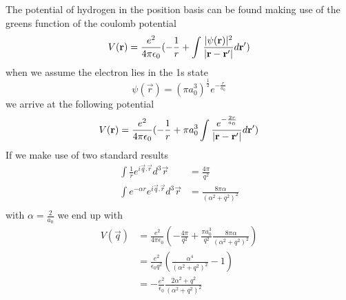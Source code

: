 The potential of hydrogen
in the position basis can be found
making use of the greens
function of the coulomb potential\cite{AQP_Problems}
\begin{equation}
    V(\mathbf{r}) = \frac{e^2}{4 \pi \epsilon_0}(
    -\frac{1}{r}
    + \int{\frac{\lvert\psi(\mathbf{r})\rvert^2}{
            \lvert\mathbf{r} - \mathbf{r'}\rvert} d\mathbf{r}'})
\end{equation}
when we assume the electron
lies in the 1s state\cite{griffiths_schroeter_2018}
\begin{equation}
    \psi(\vec{r}) = {(\pi a_0^3)}^{\frac{1}{2}} e^{-\frac{r}{a_0}}
\end{equation}
we arrive at the following potential
\begin{equation}
    V(\mathbf{r}) = \frac{e^2}{4 \pi \epsilon_0}(
    -\frac{1}{r}
    + \pi a_0^3\int{\frac{e^{-\frac{2r}{a_0}}}{
            \lvert\mathbf{r} - \mathbf{r'}\rvert} d\mathbf{r}'})
\end{equation}
If we make use of two standard results
\begin{align}
    \int{\frac{1}{r} e^{i\vec{q}.\vec{r}} d^3\vec{r}}
     & = \frac{4 \pi}{q^2}                         \\
    \int{e^{-\alpha r} e^{i\vec{q}.\vec{r}} d^3\vec{r}}
     & = \frac{8 \pi \alpha}{{(\alpha^2 + q^2)}^2} \\
\end{align}
with \(\alpha = \frac{2}{a_0}\) we end up
with
\begin{align}
    V(\vec{q}) & = \frac{e^2}{4 \pi \epsilon_0}(
    - \frac{4\pi}{q^2}
    + \frac{\pi a_0^3}{q^2}
    \frac{8 \pi \alpha}{{(\alpha^2 + q^2)}^2})   \\
               & = \frac{e^2}{\epsilon_0 q^2}(
    \frac{ \alpha^4}{{(\alpha^2 + q^2)}^2} - 1
    )                                            \\
               & =-\frac{e^2}{\epsilon_0 }
    \frac{ 2\alpha^2 + q^2 }{{(\alpha^2 + q^2)}^2}
\end{align}